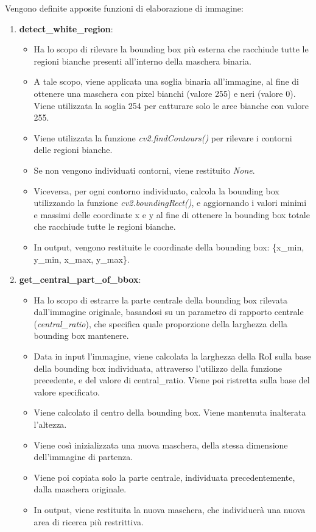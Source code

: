\documentclass[12pt,a4paper,openright,twoside]{book}
\begin{document}
Vengono definite apposite funzioni di elaborazione di immagine:
\begin{enumerate}
\item \textbf{detect\_white\_region}:
\begin{itemize}
\item Ha lo scopo di rilevare la bounding box più esterna che racchiude tutte le regioni bianche presenti all'interno della maschera binaria.
\item A tale scopo, viene applicata una soglia binaria all'immagine, al fine di ottenere una maschera con pixel bianchi (valore 255) e neri (valore 0). Viene utilizzata la soglia 254 per catturare solo le aree bianche con valore 255.
\item Viene utilizzata la funzione {\itshape cv2.findContours()} per rilevare i contorni delle regioni bianche.
\item Se non vengono individuati contorni, viene restituito {\itshape None}.
\item Viceversa, per ogni contorno individuato, calcola la bounding box utilizzando la funzione {\itshape cv2.boundingRect()}, e aggiornando i valori minimi e massimi delle coordinate x e y al fine di ottenere la bounding box totale che racchiude tutte le regioni bianche.
\item In output, vengono restituite le coordinate della bounding box: \{x\_min, y\_min, x\_max, y\_max\}.
\end{itemize}

\item \textbf{get\_central\_part\_of\_bbox}:
\begin{itemize}
\item Ha lo scopo di estrarre la parte centrale della bounding box rilevata dall'immagine originale, basandosi su un parametro di rapporto centrale ({\itshape central\_ratio}), che specifica quale proporzione della larghezza della bounding box mantenere.
\item Data in input l'immagine,  viene calcolata la larghezza della RoI sulla base della bounding box individuata, attraverso l'utilizzo della funzione precedente, e del valore di central\_ratio. Viene poi ristretta sulla base del valore specificato. 
\item Viene calcolato il centro della bounding box. Viene mantenuta inalterata l'altezza.
\item Viene così inizializzata una nuova maschera, della stessa dimensione dell'immagine di partenza.
\item Viene poi copiata solo la parte centrale, individuata precedentemente, dalla maschera originale.
\item In output, viene restituita la nuova maschera, che individuerà una nuova area di ricerca più restrittiva.
\end{itemize}


\end{enumerate}
\end{document}
